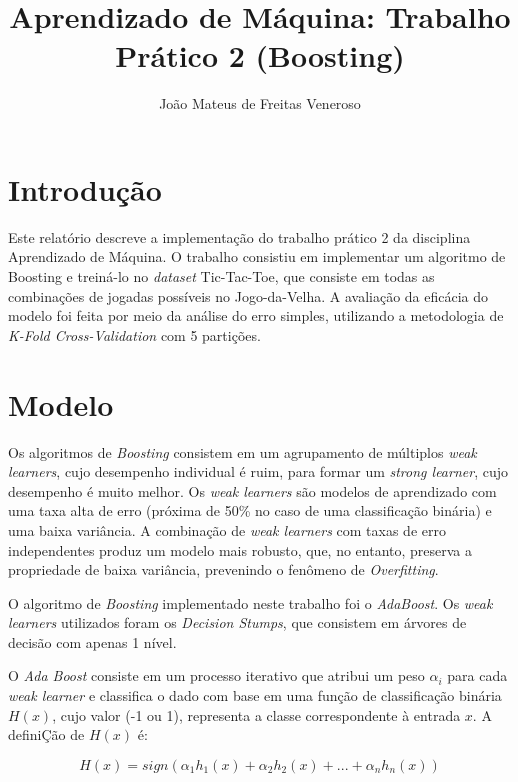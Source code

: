 \documentclass{article}
\begin{document}
\title{Aprendizado de Máquina: Trabalho Prático 2 (Boosting)}
\author{João Mateus de Freitas Veneroso}

\maketitle

\section{Introdução}

Este relatório descreve a implementação do trabalho prático 2 da disciplina Aprendizado de Máquina. 
O trabalho consistiu em implementar um algoritmo de Boosting e treiná-lo no \textit{dataset}
Tic-Tac-Toe, que consiste em todas as combinações de jogadas possíveis no Jogo-da-Velha. A
avaliação da eficácia do modelo foi feita por meio da análise do erro simples, utilizando a
metodologia de \textit{K-Fold Cross-Validation} com 5 partições.

\section{Modelo}

Os algoritmos de \textit{Boosting} consistem em um agrupamento de múltiplos \textit{weak learners},
cujo desempenho individual é ruim, para formar um \textit{strong learner}, cujo desempenho é muito melhor. 
Os \textit{weak learners} são modelos de aprendizado com uma taxa alta de erro (próxima de 50\% no 
caso de uma classificação binária) e uma baixa variância. A combinação de \textit{weak learners} 
com taxas de erro independentes produz um modelo mais robusto, que, no entanto, preserva a propriedade 
de baixa variância, prevenindo o fenômeno de \textit{Overfitting}.

O algoritmo de \textit{Boosting} implementado neste trabalho foi o \textit{AdaBoost}. Os \textit{weak learners} 
utilizados foram os \textit{Decision Stumps}, que consistem em árvores de decisão com apenas 1 nível.

O \textit{Ada Boost} consiste em um processo iterativo que atribui um peso $ \alpha_i $ para cada 
\textit{weak learner} e classifica o dado com base em uma função de classificação binária $ H(x) $,
cujo valor (-1 ou 1), representa a classe correspondente à entrada $ x $. A definiÇão de $ H(x) $ é:

\[
H(x) = sign(\alpha_1h_1(x) + \alpha_2h_2(x) + ... + \alpha_nh_n(x))
\]
\end{document}
